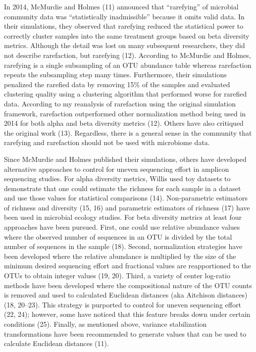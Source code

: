 \documentclass[
]{article}
\begin{document}
In 2014, McMurdie and Holmes (11) announced that ``rarefying'' of
microbial community data was ``statistically inadmissible'' because it
omits valid data. In their simulations, they observed that rarefying
reduced the statistical power to correctly cluster samples into the same
treatment groups based on beta diversity metrics. Although the detail
was lost on many subsequent researchers, they did not describe
rarefaction, but rarefying (12). According to McMurdie and Holmes,
rarefying is a single subsampling of an OTU abundance table whereas
rarefaction repeats the subsampling step many times. Furthermore, their
simulations penalized the rarefied data by removing 15\% of the samples
and evaluated clustering quality using a clustering algorithm that
performed worse for rarefied data. According to my reanalysis of
rarefaction using the original simulation framework, rarefaction
outperformed other normalization method being used in 2014 for both
alpha and beta diversity metrics (12). Others have also critiqued the
original work (13). Regardless, there is a general sense in the
community that rarefying and rarefaction should not be used with
microbiome data.

Since McMurdie and Holmes published their simulations, others have
developed alternative approaches to control for uneven sequencing effort
in amplicon sequencing studies. For alpha diversity metrics, Willis used
toy datasets to demonstrate that one could estimate the richness for
each sample in a dataset and use those values for statistical
comparisons (14). Non-parametric estimators of richness and diversity
(15, 16) and parametric estimators of richness (17) have been used in
microbial ecology studies. For beta diversity metrics at least four
approaches have been pursued. First, one could use relative abundance
values where the observed number of sequences in an OTU is divided by
the total number of sequences in the sample (18). Second, normalization
strategies have been developed where the relative abundance is
multiplied by the size of the minimum desired sequencing effort and
fractional values are reapportioned to the OTUs to obtain integer values
(19, 20). Third, a variety of center log-ratio methods have been
developed where the compositional nature of the OTU counts is removed
and used to calculated Euclidean distances (aka Aitchison distances)
(18, 20--23). This strategy is purported to control for uneven
sequencing effort (22, 24); however, some have noticed that this feature
breaks down under certain conditions (25). Finally, as mentioned above,
variance stabilization transformations have been recommended to generate
values that can be used to calculate Euclidean distances (11).
\end{document}
